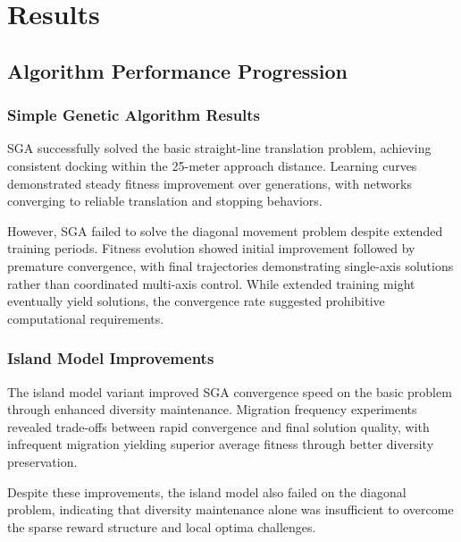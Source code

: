 \chapter{Results}

\section{Algorithm Performance Progression}

\subsection{Simple Genetic Algorithm Results}

SGA successfully solved the basic straight-line translation problem, achieving consistent docking within the 25-meter approach distance. Learning curves demonstrated steady fitness improvement over generations, with networks converging to reliable translation and stopping behaviors.

However, SGA failed to solve the diagonal movement problem despite extended training periods. Fitness evolution showed initial improvement followed by premature convergence, with final trajectories demonstrating single-axis solutions rather than coordinated multi-axis control. While extended training might eventually yield solutions, the convergence rate suggested prohibitive computational requirements.


\subsection{Island Model Improvements}

The island model variant improved SGA convergence speed on the basic problem through enhanced diversity maintenance. Migration frequency experiments revealed trade-offs between rapid convergence and final solution quality, with infrequent migration yielding superior average fitness through better diversity preservation.

Despite these improvements, the island model also failed on the diagonal problem, indicating that diversity maintenance alone was insufficient to overcome the sparse reward structure and local optima challenges.


